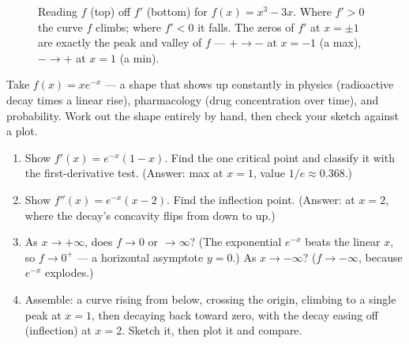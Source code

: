 \begin{figure}[H]
\centering
{}
\caption{Reading $f$ (top) off $f'$ (bottom) for $f(x)=x^3-3x$. Where $f'>0$ the
curve $f$ climbs; where $f'<0$ it falls. The zeros of $f'$ at $x=\pm1$ are exactly
the peak and valley of $f$ --- $+\to-$ at $x=-1$ (a max), $-\to+$ at $x=1$ (a min).}
\label{ch16:fig-f-and-fprime}
\end{figure}

\begin{labbox}
Take $f(x)=x e^{-x}$ --- a shape that shows up constantly in physics (radioactive
decay times a linear rise), pharmacology (drug concentration over time), and
probability. Work out the shape entirely by hand, then check your sketch against a
plot.
\begin{enumerate}
\item Show $f'(x)=e^{-x}(1-x)$. Find the one critical point and classify it with
the first-derivative test. (Answer: max at $x=1$, value $1/e\approx0.368$.)
\item Show $f''(x)=e^{-x}(x-2)$. Find the inflection point. (Answer: at $x=2$,
where the decay's concavity flips from down to up.)
\item As $x\to+\infty$, does $f\to0$ or $\to\infty$? (The exponential
$e^{-x}$ beats the linear $x$, so $f\to0^+$ --- a horizontal asymptote $y=0$.) As
$x\to-\infty$? ($f\to-\infty$, because $e^{-x}$ explodes.)
\item Assemble: a curve rising from below, crossing the origin, climbing to a single
peak at $x=1$, then decaying back toward zero, with the decay easing off (inflection)
at $x=2$. Sketch it, then plot it and compare.
\end{enumerate}
\end{labbox}

